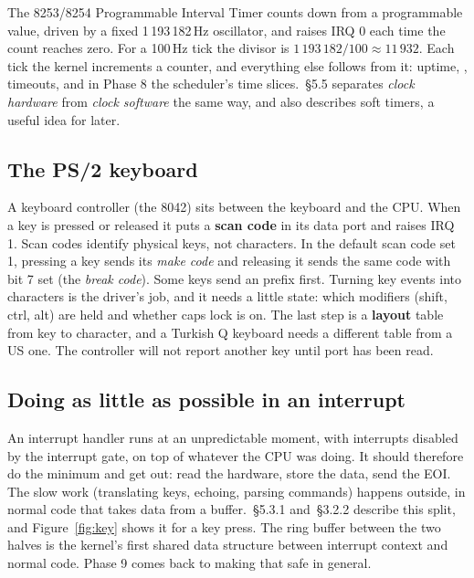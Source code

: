 \documentclass[11pt,a4paper]{article}
\begin{document}
The 8253/8254 Programmable Interval Timer counts down from a programmable value, driven by a fixed
1\,193\,182\,Hz oscillator, and raises IRQ 0 each time the count reaches zero. For a 100\,Hz tick the divisor is
$1\,193\,182 / 100 \approx 11\,932$. Each tick the kernel increments a counter, and everything else follows from it:
uptime, , timeouts, and in Phase 8 the scheduler's time slices. \MOS\,\S5.5 separates \emph{clock
hardware} from \emph{clock software} the same way, and also describes soft timers, a useful idea for later.

\subsection{The PS/2 keyboard}

A keyboard controller (the 8042) sits between the keyboard and the CPU. When a key is pressed or released it puts a
\textbf{scan code} in its data port  and raises IRQ 1. Scan codes identify physical keys, not characters.
In the default scan code set 1, pressing a key sends its \emph{make code} and releasing it sends the same code with
bit 7 set (the \emph{break code}). Some keys send an  prefix first. Turning key events into characters is
the driver's job, and it needs a little state: which modifiers (shift, ctrl, alt) are held and whether caps lock is on. The
last step is a \textbf{layout} table from key to character, and a Turkish Q keyboard needs a different table from a US
one. The controller will not report another key until port  has been read.

\subsection{Doing as little as possible in an interrupt}

An interrupt handler runs at an unpredictable moment, with interrupts disabled by the interrupt gate, on top of
whatever the CPU was doing. It should therefore do the minimum and get out: read the hardware, store the data, send
the EOI. The slow work (translating keys, echoing, parsing commands) happens outside, in normal code that takes data
from a buffer. \MOS\,\S5.3.1 and \OSDI\,\S3.2.2 describe this split, and Figure~\ref{fig:key} shows it for a key
press. The ring buffer between the two halves is the kernel's first shared data structure between interrupt context and
normal code. Phase 9 comes back to making that safe in general.
\end{document}
